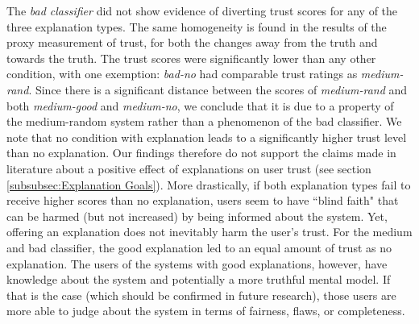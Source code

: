 The \textit{bad classifier} did not show evidence of diverting trust scores for any of the three explanation types. The same homogeneity is found in the results of the proxy measurement of trust, for both the changes away from the truth and towards the truth. The trust scores were significantly lower than any other condition, with one exemption: \textit{bad-no} had comparable trust ratings as \textit{medium-rand}. Since there is a significant distance between the scores of \textit{medium-rand} and both \textit{medium-good} and \textit{medium-no}, we conclude that it is due to a property of the medium-random system rather than a phenomenon of the bad classifier.\newline
We note that no condition with explanation leads to a significantly higher trust level than no explanation. Our findings therefore do not support the claims made in literature about a positive effect of explanations on user trust (see section \ref{subsubsec:Explanation Goals}). More drastically, if both explanation types fail to receive higher scores than no explanation, users seem to have ``blind faith" that can be harmed (but not increased) by being informed about the system. Yet, offering an explanation does not inevitably harm the user's trust. For the medium and bad classifier, the good explanation led to an equal amount of trust as no explanation. The users of the systems with good explanations, however, have knowledge about the system and potentially a more truthful mental model. If that is the case (which should be confirmed in future research), those users are more able to judge about the system in terms of fairness, flaws, or completeness.\newline
